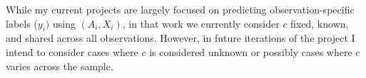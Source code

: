 \documentclass[11pt]{article}   %
\begin{document}
While my current projects are largely focused on predicting observation-specific labels ($y_i)$ using $(A_i,X_i)$, in that work we currently consider $c$ fixed, known, and shared across all observations.
However, in future iterations of the project I intend to consider cases where $c$ is considered unknown or possibly cases where $c$ varies across the sample.




\printbibliography
\end{document}
